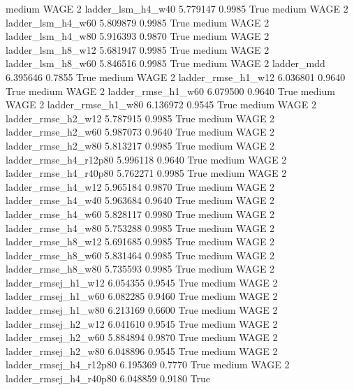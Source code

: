    medium     WAGE                 2      ladder_lsm_h4_w40   5.779147      0.9985    True
    medium     WAGE                 2      ladder_lsm_h4_w60   5.809879      0.9985    True
    medium     WAGE                 2      ladder_lsm_h4_w80   5.916393      0.9870    True
    medium     WAGE                 2      ladder_lsm_h8_w12   5.681947      0.9985    True
    medium     WAGE                 2      ladder_lsm_h8_w60   5.846516      0.9985    True
    medium     WAGE                 2             ladder_mdd   6.395646      0.7855    True
    medium     WAGE                 2     ladder_rmse_h1_w12   6.036801      0.9640    True
    medium     WAGE                 2     ladder_rmse_h1_w60   6.079500      0.9640    True
    medium     WAGE                 2     ladder_rmse_h1_w80   6.136972      0.9545    True
    medium     WAGE                 2     ladder_rmse_h2_w12   5.787915      0.9985    True
    medium     WAGE                 2     ladder_rmse_h2_w60   5.987073      0.9640    True
    medium     WAGE                 2     ladder_rmse_h2_w80   5.813217      0.9985    True
    medium     WAGE                 2  ladder_rmse_h4_r12p80   5.996118      0.9640    True
    medium     WAGE                 2  ladder_rmse_h4_r40p80   5.762271      0.9985    True
    medium     WAGE                 2     ladder_rmse_h4_w12   5.965184      0.9870    True
    medium     WAGE                 2     ladder_rmse_h4_w40   5.963684      0.9640    True
    medium     WAGE                 2     ladder_rmse_h4_w60   5.828117      0.9980    True
    medium     WAGE                 2     ladder_rmse_h4_w80   5.753288      0.9985    True
    medium     WAGE                 2     ladder_rmse_h8_w12   5.691685      0.9985    True
    medium     WAGE                 2     ladder_rmse_h8_w60   5.831464      0.9985    True
    medium     WAGE                 2     ladder_rmse_h8_w80   5.735593      0.9985    True
    medium     WAGE                 2    ladder_rmsej_h1_w12   6.054355      0.9545    True
    medium     WAGE                 2    ladder_rmsej_h1_w60   6.082285      0.9460    True
    medium     WAGE                 2    ladder_rmsej_h1_w80   6.213169      0.6600    True
    medium     WAGE                 2    ladder_rmsej_h2_w12   6.041610      0.9545    True
    medium     WAGE                 2    ladder_rmsej_h2_w60   5.884894      0.9870    True
    medium     WAGE                 2    ladder_rmsej_h2_w80   6.048896      0.9545    True
    medium     WAGE                 2 ladder_rmsej_h4_r12p80   6.195369      0.7770    True
    medium     WAGE                 2 ladder_rmsej_h4_r40p80   6.048859      0.9180    True
